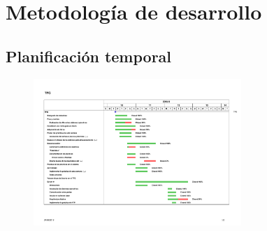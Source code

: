 \chapter{Metodología de desarrollo}

\section{Planificación temporal}

% 
% 
% 
% 
% 
% 
% 

\begin{figure}[H]
\centering
\includegraphics[width=0.7\textwidth]{Chapters/Chapter10/Figures/tfg-gantt-mar}
\end{figure}

